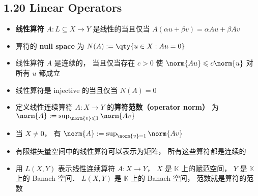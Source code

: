 \subsection{1.20 Linear Operators}

\begin{itemize}
\item \textbf{线性算符} $A: L \subseteq X\to Y$ 是线性的当且仅当 $A (\alpha u + \beta v) = \alpha Au + \beta Av$

\item 算符的 \textbf{null space} 为 $N(A) := \qty{u \in X: Au = 0}$

\item 线性算符 $A$ 是连续的， 当且仅当存在 $c > 0$ 使 $\norm{Au} \leqslant c\norm{u}$ 对所有 $u$ 都成立

\item 线性算符是 injective 的当且仅当 $N(A) = {0}$

\item 定义线性连续算符 $A: X \to Y$ 的\textbf{算符范数（operator norm）} 为 $\norm{A} := \sup_{\norm{v} \leqslant 1} \norm{A v}$

\item 当 $X \ne {0}$， 有 $\norm{A} := \sup_{\norm{v} = 1} \norm{A v}$

\item 有限维矢量空间中的线性算符可以表示为矩阵， 所有这些算符都是连续的

\item 用 $L(X, Y)$ 表示线性连续算符 $A: X \to Y$， $X$ 是 $\mathbb K$ 上的赋范空间， $Y$ 是 $\mathbb K$ 上的 Banach 空间． $L(X, Y)$ 是 $\mathbb K$ 上的 Banach 空间， 范数就是算符的范数
\end{itemize}


